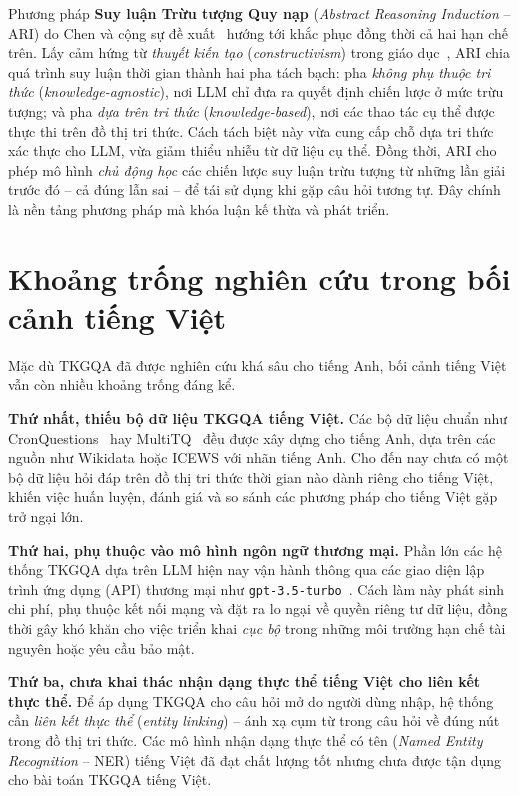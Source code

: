 Phương pháp \textbf{Suy luận Trừu tượng Quy nạp} (\textit{Abstract Reasoning Induction} -- ARI)
do Chen và cộng sự đề xuất~\cite{chen2024ari} hướng tới khắc phục đồng thời cả hai hạn chế trên.
Lấy cảm hứng từ \textit{thuyết kiến tạo} (\textit{constructivism}) trong giáo
dục~\cite{savery1995constructivism}, ARI chia quá trình suy luận thời gian thành hai pha tách
bạch: pha \textit{không phụ thuộc tri thức} (\textit{knowledge-agnostic}), nơi LLM chỉ đưa ra
quyết định chiến lược ở mức trừu tượng; và pha \textit{dựa trên tri thức}
(\textit{knowledge-based}), nơi các thao tác cụ thể được thực thi trên đồ thị tri thức. Cách tách
biệt này vừa cung cấp chỗ dựa tri thức xác thực cho LLM, vừa giảm thiểu nhiễu từ dữ liệu cụ thể.
Đồng thời, ARI cho phép mô hình \emph{chủ động học} các chiến lược suy luận trừu tượng từ những
lần giải trước đó -- cả đúng lẫn sai -- để tái sử dụng khi gặp câu hỏi tương tự. Đây chính là nền
tảng phương pháp mà khóa luận kế thừa và phát triển.

\section{Khoảng trống nghiên cứu trong bối cảnh tiếng Việt}
\label{sec:gap}

Mặc dù TKGQA đã được nghiên cứu khá sâu cho tiếng Anh, bối cảnh tiếng Việt vẫn còn nhiều khoảng
trống đáng kể.

\textbf{Thứ nhất, thiếu bộ dữ liệu TKGQA tiếng Việt.} Các bộ dữ liệu chuẩn như
CronQuestions~\cite{saxena2021cronkgqa} hay MultiTQ~\cite{chen2023multitq} đều được xây dựng cho
tiếng Anh, dựa trên các nguồn như Wikidata hoặc ICEWS với nhãn tiếng Anh. Cho đến nay chưa có một
bộ dữ liệu hỏi đáp trên đồ thị tri thức thời gian nào dành riêng cho tiếng Việt, khiến việc huấn
luyện, đánh giá và so sánh các phương pháp cho tiếng Việt gặp trở ngại lớn.

\textbf{Thứ hai, phụ thuộc vào mô hình ngôn ngữ thương mại.} Phần lớn các hệ thống TKGQA dựa trên
LLM hiện nay vận hành thông qua các giao diện lập trình ứng dụng (API) thương mại như
\texttt{gpt-3.5-turbo}~\cite{chen2024ari}. Cách làm này phát sinh chi phí, phụ thuộc kết nối mạng
và đặt ra lo ngại về quyền riêng tư dữ liệu, đồng thời gây khó khăn cho việc triển khai
\emph{cục bộ} trong những môi trường hạn chế tài nguyên hoặc yêu cầu bảo mật.

\textbf{Thứ ba, chưa khai thác nhận dạng thực thể tiếng Việt cho liên kết thực thể.} Để áp dụng
TKGQA cho câu hỏi mở do người dùng nhập, hệ thống cần \textit{liên kết thực thể} (\textit{entity
linking}) -- ánh xạ cụm từ trong câu hỏi về đúng nút trong đồ thị tri thức. Các mô hình nhận dạng
thực thể có tên (\textit{Named Entity Recognition} -- NER) tiếng Việt đã đạt chất lượng tốt nhưng
chưa được tận dụng cho bài toán TKGQA tiếng Việt.

